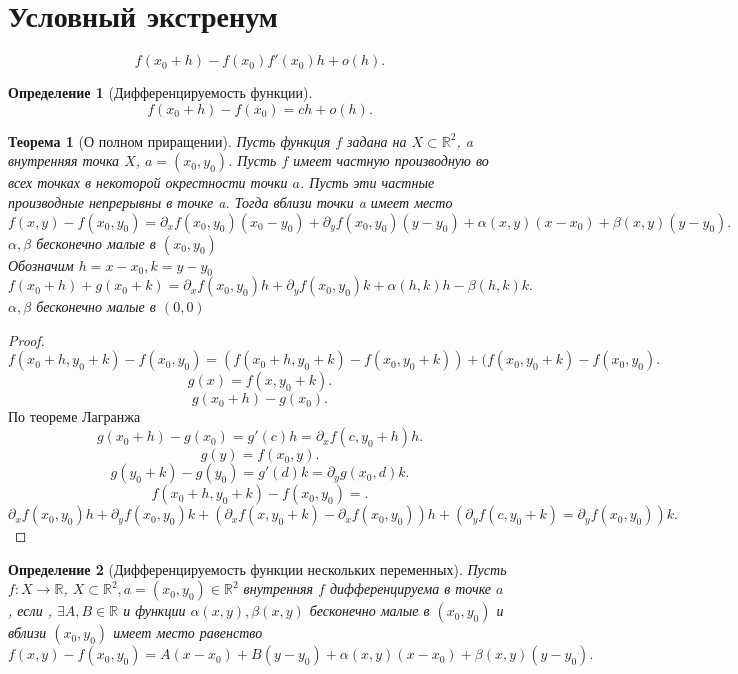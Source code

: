 \documentclass[14pt]{extarticle} \usepackage{fontspec}
\newtheorem{theorem}{Теорема}
\newtheorem{definition}{Определение}
\begin{document}
\section{Условный экстренум}
\[
f(x_0 + h) - f(x_0) f'(x_0) h + o(h)
.\] 
\begin{definition}[Дифференцируемость функции]
    \[
    f(x_0 + h) - f(x_0) = ch + o(h)
    .\] 
\end{definition}
\begin{theorem}[О полном приращении]
    Пусть функция $f$ задана на  $X \subset \mathbb{R}^{2}$, a внутренняя точка $X$, $a = (x_0,y_0)$.  Пусть $f$ имеет частную производную во всех точках в некоторой окрестности точки  $a$. Пусть эти частные производные непрерывны в точке a. Тогда вблизи точки a имеет место
     \[
    f(x,y) - f(x_0,y_0) = \partial_{x} f (x_0,y_0) (x_0 - y_0) + \partial_{y}f (x_0,y_0) (y - y_0) + \alpha(x,y) (x - x_0) + \beta(x,y) (y - y_0)
    .\] 
    $\alpha,\beta$ бесконечно малые в  $(x_0,y_0)$\\
    Обозначим $h = x - x_0, k = y-y_0$
    \[
        f(x_0 + h) + g(x_0 + k) = \partial_{x} f(x_0,y_0) h + \partial_{y} f(x_0,y_0) k
        + \alpha(h,k)h - \beta(h,k)k
    .\] 
    $\alpha,\beta$ бесконечно малые в  $(0,0)$
\end{theorem}
\begin{proof}
    \[
    f(x_0 + h,y_0 + k) - f(x_0,y_0) = ( f(x_0 + h,y_0 +k)  - f(x_0,y_0 + k) ) +
    (f(x_0,y_0 + k) - f(x_0,y_0)
    .\] 
    \[
        g(x) = f(x,y_0+k)
    .\] 
    \[
    g(x_0 + h) - g(x_0)
    .\] 
    По теореме Лагранжа
    \[
    g(x_0 + h) - g(x_0) = g'(c)h = \partial_{x}f(c,y_0 + h) h
    .\] 
    \[
        g(y) = f(x_0,y)
    .\] 
    \[
    g(y_0 + k) - g(y_0) = g'(d) k = \partial_{y} g(x_0,d) k
    .\] 
    \[
        f(x_0 + h,y_0 +k) -f(x_0,y_0) =      .\] 
    \[
    \partial_{x} f(x_0,y_0) h + \partial_{y} f(x_0,y_0) k + (\partial_{x} f(x,y_0+k) - \partial_{x} f(x_0,y_0))h + (\partial_{y}f (c,y_0 + k) = \partial_{y}f(x_0,y_0))k
    .\] 
\end{proof}
\begin{definition}[Дифференцируемость функции нескольких переменных]
    Пусть $f : X \to \mathbb{R}$, $X \subset \mathbb{R}^{2} , a = (x_0,y_0) \in \mathbb{R}^2$ внутренняя
    $f$ дифференцируема в точке  $a$ , если , $\exists A,B \in \mathbb{R}$ и функции  $\alpha(x,y), \beta(x,y)$ бесконечно малые в  $(x_0,y_0)$ и вблизи $(x_0,y_0)$ имеет место равенство
    \[
    f(x,y) -  f(x_0,y_0) = A (x - x_0) + B(y-y_0) + \alpha(x,y) (x - x_0)  + \beta(x,y) (y - y_0)
    .\] 
\end{definition}
\end{document}
